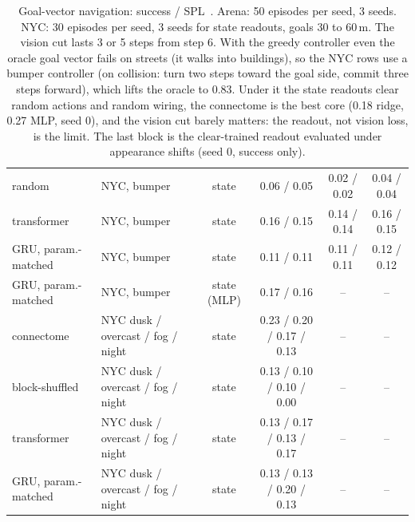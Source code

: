 \begin{table}[h]
{\begin{tabular}{llcccc}
    random & NYC, bumper & state & 0.06 / 0.05 & 0.02 / 0.02 & 0.04 / 0.04 \\
    transformer & NYC, bumper & state & 0.16 / 0.15 & 0.14 / 0.14 & 0.16 / 0.15 \\
    GRU, param.-matched & NYC, bumper & state & 0.11 / 0.11 & 0.11 / 0.11 & 0.12 / 0.12 \\
    GRU, param.-matched & NYC, bumper & state (MLP) & 0.17 / 0.16 & -- & -- \\
    \midrule
    connectome & NYC dusk / overcast / fog / night & state & 0.23 / 0.20 / 0.17 / 0.13 & -- & -- \\
    block-shuffled & NYC dusk / overcast / fog / night & state & 0.13 / 0.10 / 0.10 / 0.00 & -- & -- \\
    transformer & NYC dusk / overcast / fog / night & state & 0.13 / 0.17 / 0.13 / 0.17 & -- & -- \\
    GRU, param.-matched & NYC dusk / overcast / fog / night & state & 0.13 / 0.13 / 0.20 / 0.13 & -- & -- \\
    \bottomrule
  \end{tabular}}
  \caption{Goal-vector navigation: success / SPL~\cite{anderson2018evaluation}. Arena: 50 episodes per seed, 3 seeds.
  NYC: 30 episodes per seed, 3 seeds for state readouts, goals 30 to 60\,m. The vision cut lasts 3 or 5 steps from
  step 6. With the greedy controller even the oracle goal vector fails on streets (it walks into buildings), so the NYC
  rows use a bumper controller (on collision: turn two steps toward the goal side, commit three steps forward), which
  lifts the oracle to 0.83. Under it the state readouts clear random actions and random wiring, the connectome is the
  best core (0.18 ridge, 0.27 MLP, seed 0), and the vision cut barely matters: the readout, not vision loss, is the
  limit. The last block is the clear-trained readout evaluated under appearance shifts (seed 0, success only).}
  \label{tab:goalnav}
\end{table}

